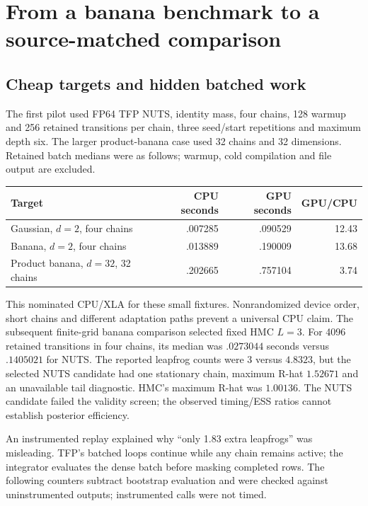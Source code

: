 \section[Stan comparisons]{From a banana benchmark to a source-matched comparison}
\label{sec:sw-stan-results}

\subsection{Cheap targets and hidden batched work}

The first pilot used FP64 TFP NUTS, identity mass, four chains, 128 warmup
and 256 retained transitions per chain, three seed/start repetitions and
maximum depth six. The larger product-banana case used 32 chains and
32 dimensions. Retained batch medians were as follows; warmup, cold
compilation and file output are excluded.

\begin{center}\small
\begin{tabular}{lrrr}
\toprule
Target & CPU seconds & GPU seconds & GPU/CPU\\
\midrule
Gaussian, $d=2$, four chains & .007285 & .090529 & 12.43\\
Banana, $d=2$, four chains & .013889 & .190009 & 13.68\\
Product banana, $d=32$, 32 chains & .202665 & .757104 & 3.74\\
\bottomrule
\end{tabular}
\end{center}

This nominated CPU/XLA for these small fixtures. Nonrandomized device order,
short chains and different adaptation paths prevent a universal CPU claim.
The subsequent finite-grid banana comparison selected fixed HMC $L=3$.
For 4096 retained transitions in four chains, its median was $.0273044$
seconds versus $.1405021$ for NUTS. The reported leapfrog counts were
$3$ versus $4.8323$, but the selected NUTS candidate had one stationary
chain, maximum R-hat $1.52671$ and an unavailable tail diagnostic. HMC's
maximum R-hat was $1.00136$. The NUTS candidate failed the validity screen;
the observed timing/ESS ratios cannot establish posterior efficiency.

An instrumented replay explained why ``only 1.83 extra leapfrogs'' was
misleading. TFP's batched loops continue while any chain remains active;
the integrator evaluates the dense batch before masking completed rows.
The following counters subtract bootstrap evaluation and were checked
against uninstrumented outputs; instrumented calls were not timed.

